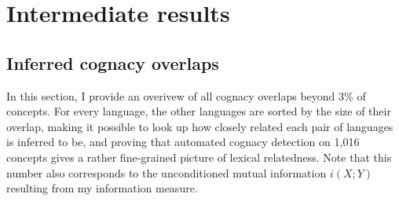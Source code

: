 \chapter{Intermediate results}

\section{Inferred cognacy overlaps}
In this section, I provide an overivew of all cognacy overlaps beyond $3\%$ of concepts.
For every language, the other languages are sorted by the size of their overlap, making it possible to look up how closely related each pair of languages is inferred to be, and proving that automated cognacy detection on 1,016 concepts gives a rather fine-grained picture of lexical relatedness. Note that this number also corresponds to the unconditioned mutual information $i(X;Y)$ resulting from my information measure.

